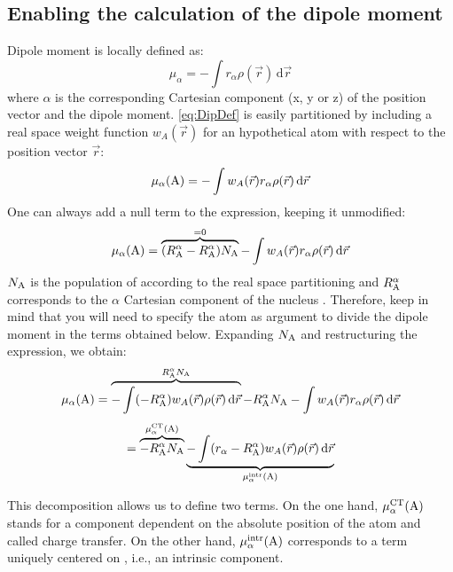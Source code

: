 \documentclass[a4paper,11pt,openany]{memoir}
\begin{document}
\subsection{Enabling the calculation of the dipole moment}\label{subsec:DipMom}
Dipole moment is locally defined as:
\begin{equation}\label{eq:DipDef}
	\mu_{\alpha} = - \int r_{\alpha} \rho(\vec{r})\,\mathrm{d}\vec{r}
\end{equation}
where $\alpha$ is the corresponding Cartesian component (x, y or z) of the position vector and the dipole moment. \autoref{eq:DipDef} is easily partitioned by including a real space weight function $w_A(\vec{r})$ for an hypothetical atom  with respect to the position vector $\vec{r}$:
\begin{equation}\label{eq:AtomicDipDef}
	\mu_{\alpha}(\ce{A}) = - \int w_A(\vec{r})r_{\alpha} \rho(\vec{r})\,\mathrm{d}\vec{r}
\end{equation}
One can always add a null term to the expression, keeping it unmodified:
\begin{equation}
	\mu_{\alpha}(\ce{A}) = \overbrace{(R_{\ce{A}}^{\alpha} - R_{\ce{A}}^{\alpha})N_{\ce{A}}}^{=0}
						   - \int w_A(\vec{r})r_{\alpha} \rho(\vec{r})\,\mathrm{d}\vec{r}
\end{equation}
$N_{\ce{A}}$ is the population of  according to the real space partitioning and $R_{\ce{A}}^{\alpha}$ corresponds to the $\alpha$ Cartesian component of the nucleus . Therefore, keep in mind that you will need to specify the atom as argument to divide the dipole moment in the terms obtained below. Expanding $N_{\ce{A}}$ and restructuring the expression, we obtain:
\begin{equation}
	\mu_{\alpha}(\ce{A}) =
						   \overbrace{- \int(- R_{\ce{A}}^{\alpha}) w_A(\vec{r})\rho(\vec{r})\,\mathrm{d}\vec{r}}^{R_{\ce{A}}^{\alpha} N_{\ce{A}}}
						   - R_{\ce{A}}^{\alpha} N_{\ce{A}}
						   - \int w_A(\vec{r})r_{\alpha} \rho(\vec{r})\,\mathrm{d}\vec{r}
\end{equation}
\begin{equation}\label{eq:DipPart}
	 =
							\overbrace{- R_{\ce{A}}^{\alpha} N_{\ce{A}}}^{\mu_{\alpha}^{\text{CT}}(\ce{A})}
							\underbrace{- \int ( r_{\alpha}- R_{\ce{A}}^{\alpha} )w_A(\vec{r}) \rho(\vec{r})\,\mathrm{d}\vec{r}}_{\mu_{\alpha}^{\text{intr}}(\ce{A})}
\end{equation}

This decomposition allows us to define two terms. On the one hand, $\mu_{\alpha}^{\text{CT}}(\ce{A})$ stands for a component dependent on the absolute position of the atom  and called charge transfer. On the other hand, $\mu_{\alpha}^{\text{intr}}(\ce{A})$ corresponds to a term uniquely centered on , i.e., an intrinsic component.
\end{document}
